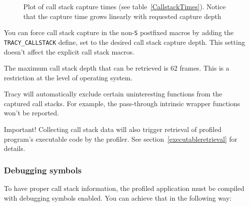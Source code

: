 \documentclass[hidelinks,titlepage,a4paper]{article}
\begin{document}
\begin{figure}[h]
\centering{}
\caption{Plot of call stack capture times (see table~\ref{CallstackTimes}). Notice that the capture time grows linearly with requested capture depth}
\label{CallstackPlot}
\end{figure}

You can force call stack capture in the non-\texttt{S} postfixed macros by adding the \texttt{TRACY\_CALLSTACK} define, set to the desired call stack capture depth. This setting doesn't affect the explicit call stack macros.

The maximum call stack depth that can be retrieved is 62 frames. This is a restriction at the level of operating system.

Tracy will automatically exclude certain uninteresting functions from the captured call stacks. For example, the pass-through intrinsic wrapper functions won't be reported.

\begin{bclogo}[
noborder=true,
couleur=black!5,
logo=\bcbombe
]{Important!}
Collecting call stack data will also trigger retrieval of profiled program's executable code by the profiler. See section~\ref{executableretrieval} for details.
\end{bclogo}

\subsubsection{Debugging symbols}

To have proper call stack information, the profiled application must be compiled with debugging symbols enabled. You can achieve that in the following way:
\end{document}
